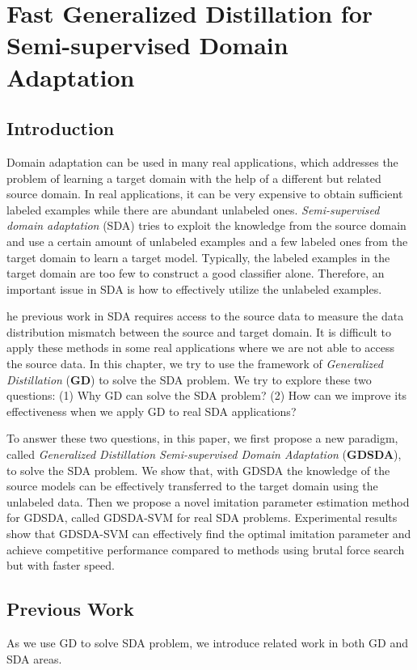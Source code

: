 \chapter{Fast Generalized Distillation for Semi-supervised Domain Adaptation}\label{sec:aaai}
\section{Introduction}
Domain adaptation can be used in many real applications, which addresses the problem of learning a target domain with the help of a different but related source domain. 
In real applications, it can be very expensive to obtain sufficient labeled examples while there are abundant unlabeled ones. 
\textit{Semi-supervised domain adaptation} (SDA) tries to exploit the knowledge from the source domain and use a certain amount of unlabeled examples and a few labeled ones from the target domain to learn a target model. Typically, the labeled examples in the target domain are too few to construct a good classifier alone. Therefore, an important issue in SDA is how to effectively utilize the unlabeled examples.

he previous work in SDA requires access to the source data to measure the data distribution mismatch between the source and target domain\cite{duan2009domain,Donahue_2013_CVPR,daume2010frustratingly,yao2015semi}. It is difficult to apply these methods in some real applications where we are not able to access the source data. In this chapter, we try to use the framework of \textit{Generalized Distillation} (\textbf{GD})\cite{lopez2015unifying} to solve the SDA problem. We try to explore these two questions: (1) Why GD can solve the SDA problem? (2) How can we improve its effectiveness when we apply GD to real SDA applications?

To answer these two questions, in this paper, we first propose a new paradigm, called \textit{Generalized Distillation Semi-supervised Domain Adaptation} (\textbf{GDSDA}), to solve the SDA problem. We show that, with GDSDA the knowledge of the source models can be effectively transferred to the target domain using the unlabeled data. Then we propose a novel imitation parameter estimation method for GDSDA, called GDSDA-SVM for real SDA problems. Experimental results show that GDSDA-SVM can effectively find the optimal imitation parameter and achieve competitive performance compared to methods using brutal force search but with faster speed. 

\section{Previous Work}\label{sec:aaai:work}
As we use GD to solve SDA problem, we introduce related work in both GD and SDA areas.

